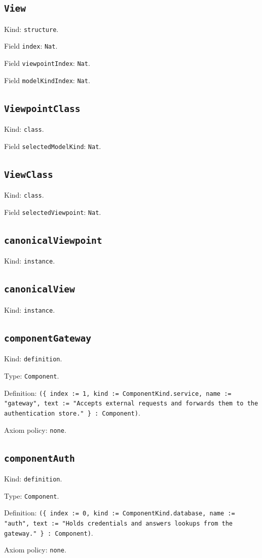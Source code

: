 \documentclass[11pt]{article}
\begin{document}
\subsection*{\texttt{View}}
\noindent Kind: \texttt{structure}.\par
\noindent Field \texttt{index}: \texttt{Nat}.\par
\noindent Field \texttt{viewpointIndex}: \texttt{Nat}.\par
\noindent Field \texttt{modelKindIndex}: \texttt{Nat}.\par
\subsection*{\texttt{ViewpointClass}}
\noindent Kind: \texttt{class}.\par
\noindent Field \texttt{selectedModelKind}: \texttt{Nat}.\par
\subsection*{\texttt{ViewClass}}
\noindent Kind: \texttt{class}.\par
\noindent Field \texttt{selectedViewpoint}: \texttt{Nat}.\par
\subsection*{\texttt{canonicalViewpoint}}
\noindent Kind: \texttt{instance}.\par
\subsection*{\texttt{canonicalView}}
\noindent Kind: \texttt{instance}.\par
\subsection*{\texttt{componentGateway}}
\noindent Kind: \texttt{definition}.\par
\noindent Type: \texttt{Component}.\par
\noindent Definition: \texttt{(\{ index := 1, kind := ComponentKind.service, name := "gateway", text := "Accepts external requests and forwards them to the authentication store." \} : Component)}.\par
\noindent Axiom policy: \texttt{none}.\par
\subsection*{\texttt{componentAuth}}
\noindent Kind: \texttt{definition}.\par
\noindent Type: \texttt{Component}.\par
\noindent Definition: \texttt{(\{ index := 0, kind := ComponentKind.database, name := "auth", text := "Holds credentials and answers lookups from the gateway." \} : Component)}.\par
\noindent Axiom policy: \texttt{none}.\par
\end{document}
